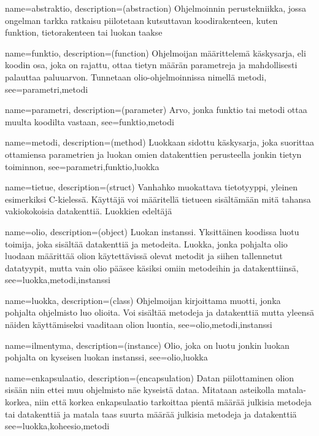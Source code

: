 {
    name=abstraktio,
    description={(abstraction) Ohjelmoinnin perustekniikka, jossa ongelman
tarkka ratkaisu piilotetaan kutsuttavan koodirakenteen, kuten funktion, 
tietorakenteen tai luokan taakse}
}

{
    name=funktio,
    description={(function) Ohjelmoijan määrittelemä käskysarja, eli koodin
osa, joka on rajattu, ottaa tietyn määrän parametreja ja mahdollisesti
palauttaa paluuarvon. Tunnetaan olio-ohjelmoinnissa nimellä metodi},
    see={parametri,metodi}
}

{
    name=parametri,
    description={(parameter) Arvo, jonka funktio tai metodi ottaa muulta
koodilta vastaan},
    see={funktio,metodi}
}

{
    name=metodi,
    description={(method) Luokkaan sidottu käskysarja, joka suorittaa
ottamiensa parametrien ja luokan omien datakenttien perusteella jonkin tietyn
toiminnon},
    see={parametri,funktio,luokka}
}

{
    name=tietue,
    description={(struct) Vanhahko muokattava tietotyyppi, yleinen esimerkiksi
C-kielessä. Käyttäjä voi määritellä tietueen sisältämään mitä tahansa
vakiokokoisia datakenttiä. Luokkien edeltäjä}
}

{
    name=olio,
    description={(object) Luokan instanssi. Yksittäinen koodissa luotu
toimija, joka sisältää datakenttiä ja metodeita. Luokka, jonka pohjalta olio
luodaan määrittää olion käytettävissä olevat metodit ja siihen
tallennetut datatyypit, mutta vain olio pääsee käsiksi omiin metodeihin
ja datakenttiinsä},
    see={luokka,metodi,instanssi}
}

{
    name=luokka,
    description={(class) Ohjelmoijan kirjoittama muotti, jonka pohjalta
ohjelmisto luo olioita. Voi sisältää metodeja ja datakenttiä mutta yleensä
näiden käyttämiseksi vaaditaan olion luontia},
    see={olio,metodi,instanssi}
}

{
    name=ilmentyma,
    description={(instance) Olio, joka on luotu jonkin luokan pohjalta on
kyseisen luokan instanssi},
    see={olio,luokka}
}

{
    name=enkapsulaatio,
    description={(encapsulation) Datan piilottaminen olion sisään niin ettei
muu ohjelmisto näe kyseistä dataa. Mitataan asteikolla matala-korkea, niin että
korkea enkapsulaatio tarkoittaa pientä määrää julkisia metodeja tai datakenttiä
ja matala taas suurta määrää julkisia metodeja ja datakenttiä}
    see={luokka,koheesio,metodi}
}

